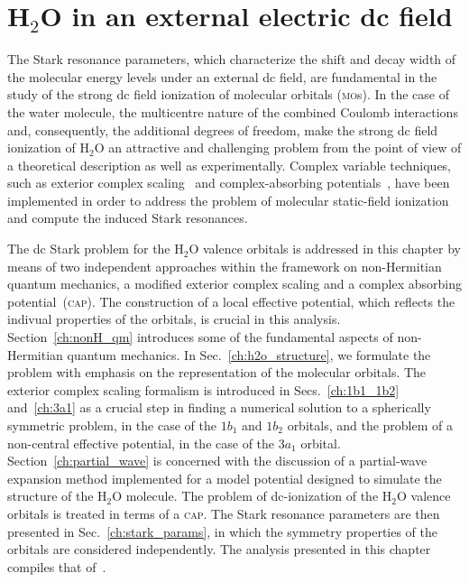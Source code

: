 \chapter{H$_{2}$O in an external electric dc field}
\label{ch:dc_h2o}



The Stark resonance parameters, which characterize the shift and decay
width of the molecular energy levels under an external dc field, are
fundamental in the study of the strong dc field ionization of
molecular orbitals (\textsc{mo}s). In the case of the water molecule,
the multicentre nature of the combined Coulomb interactions and,
consequently, the additional degrees of freedom, make the strong dc
field ionization of H$_{2}$O an attractive and challenging problem
from the point of view of a theoretical description as well as
experimentally.%
Complex variable techniques, such as exterior complex
scaling~\cite{Simon_1979,ecsScrinzi} and complex-absorbing
potentials~\cite{RissMeyer_1993,Krause_2014}, have been implemented in
order to address the problem of molecular static-field ionization and
compute the induced Stark resonances.

The dc Stark problem for the H$_{2}$O valence orbitals is addressed in
this chapter by means of two independent approaches within the
framework on non-Hermitian quantum mechanics, a modified exterior
complex scaling and a complex absorbing potential~(\textsc{cap}). The
construction of a local effective potential, which reflects the
indivual properties of the orbitals, is crucial in this
analysis. Section~\ref{ch:nonH_qm} introduces some of the fundamental
aspects of non-Hermitian quantum mechanics. In
Sec.~\ref{ch:h2o_structure}, we formulate the problem with emphasis on
the representation of the molecular orbitals. The exterior complex
scaling formalism is introduced in Secs.~\ref{ch:1b1_1b2}
and~\ref{ch:3a1} as a crucial step in finding a numerical solution to
a spherically symmetric problem, in the case of the $1b_{1}$ and
$1b_{2}$ orbitals, and the problem of a non-central effective
potential, in the case of the $3a_{1}$
orbital. Section~\ref{ch:partial_wave} is concerned with the
discussion of a partial-wave expansion method implemented for a model
potential designed to simulate the structure of the H$_{2}$O
molecule. The problem of dc-ionization of the H$_{2}$O valence
orbitals is treated in terms of a \textsc{cap}. The Stark resonance
parameters are then presented in Sec.~\ref{ch:stark_params}, in which
the symmetry properties of the orbitals are considered
independently. The analysis presented in this chapter compiles that
of~\cite{sarias_2016,sarias_2017}.


